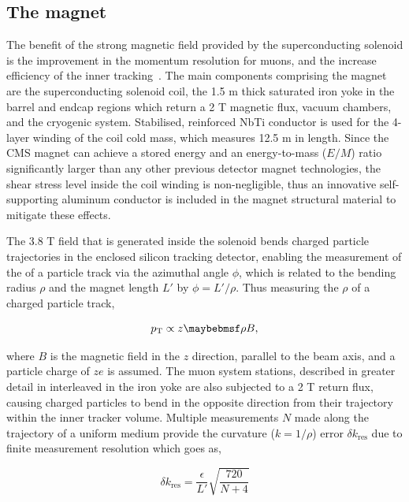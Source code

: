 \subsection{The magnet}
\label{subsec:magnet}

The benefit of the strong magnetic field provided by the superconducting solenoid is the improvement in the momentum resolution for muons, and the increase efficiency of the inner tracking~\cite{tdrmagnet}. The main components comprising the magnet are the superconducting solenoid coil, the 1.5 m thick saturated iron yoke in the barrel and endcap regions which return a 2 T magnetic flux, vacuum chambers, and the cryogenic system. Stabilised, reinforced NbTi conductor is used for the 4-layer winding of the coil cold mass, which measures 12.5 m in length. Since the CMS magnet can achieve a stored energy and an energy-to-mass ($E/M$) ratio significantly larger than any other previous detector magnet technologies, the shear stress level inside the coil winding is non-negligible, thus an innovative self-supporting aluminum conductor is included in the magnet structural material to mitigate these effects. 

The 3.8 T field that is generated inside the solenoid bends charged particle trajectories in the enclosed silicon tracking detector, enabling the measurement of the \pt of a particle track via the azimuthal angle $\phi$, which is related to the bending radius $\rho$ and the magnet length $L'$ by $\phi = L'/\rho$. Thus measuring the $\rho$ of a charged particle track, 

\begin{equation}
  \pt \propto z\rho B,
\end{equation} 

where $B$ is the magnetic field in the $z$ direction, parallel to the beam axis, and a particle charge of $ze$ is assumed. The muon system stations, described in greater detail in  interleaved in the iron yoke are also subjected to a 2 T return flux, causing charged particles to bend in the opposite direction from their trajectory within the inner tracker volume. Multiple measurements $N$ made along the trajectory of a uniform medium provide the curvature ($k=1/\rho$) error $\delta k_{\textrm{res}}$ due to finite measurement resolution which goes as,

\begin{equation}
  \delta k_{\textrm{res}} = \frac{\epsilon}{L'}\sqrt{\frac{720}{N+4}}
\end{equation} 

